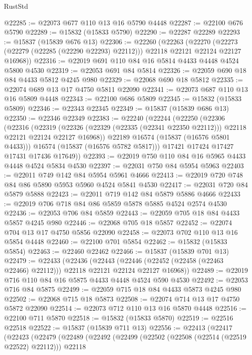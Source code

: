 \begin{lexlean}{RustStd}
\begin{coremodule}
@22285 := @22073 @677 @110 @13 @16 @5790 @4448
@22287 := @22100 @676 @5790
@22289 := @15832 (@15833 @5790)
@22290 := @22287 @22289
@22293 := @15837 (@15839 @676 @13)
@22306 := @22260
    (@22263
      (@22270 (@22273 (@22279 (@22285 (@22290 @22293) @22112))) @22118 @22121 @22124 @22127 @16968))
@22316 := @22019 @691 @110 @84 @16 @5814 @4433 @4448 @4524 @5800 @4530
@22319 := @22053 @691 @84 @5814
@22326 := @22059 @690 @18 @84 @4433 @5812 @4245 @980
@22329 := @22068 @690 @18 @5812
@22335 := @22074 @689 @13 @17 @4750 @5811 @22090
@22341 := @22073 @687 @110 @13 @16 @5809 @4448
@22343 := @22100 @686 @5809
@22345 := @15832 (@15833 @5809)
@22346 := @22343 @22345
@22349 := @15837 (@15839 @686 @13)
@22350 := @22346 @22349
@22383 := @22240
    (@22244
      (@22250
        (@22306
          (@22316
            (@22319
              (@22326 (@22329 (@22335 (@22341 @22350 @22112))) @22118 @22121 @22124 @22127 @16968))
            @22189
            @16574
            (@15837 (@16576 @5801 @4433)))
          @16574
          (@15837 (@16576 @5782 @5817)))
        @17421
        @17424
        @17427
        @17431
        @17436
        @17649))
@22393 := @22019 @750 @110 @84 @16 @5965 @4433 @4448 @4524 @5834 @4530
@22397 := @22031 @750 @84 @5954 @5963
@22403 := @22011 @749 @142 @84 @5954 @5961 @4666
@22413 := @22019 @720 @748 @84 @86 @5890 @5953 @5960 @4524 @5841 @4530
@22417 := @22031 @720 @84 @5879 @5888
@22423 := @22011 @719 @142 @84 @5879 @5886 @4666
@22433 := @22019 @706 @718 @84 @86 @5859 @5878 @5885 @4524 @2574 @4530
@22436 := @22053 @706 @84 @5859
@22443 := @22059 @705 @18 @84 @4433 @5857 @4245 @980
@22446 := @22068 @705 @18 @5857
@22452 := @22074 @704 @13 @17 @4750 @5856 @22090
@22458 := @22073 @702 @110 @13 @16 @5854 @4448
@22460 := @22100 @701 @5854
@22462 := @15832 (@15833 @5854)
@22463 := @22460 @22462
@22466 := @15837 (@15839 @701 @13)
@22479 := @22433
    (@22436
      (@22443 (@22446 (@22452 (@22458 (@22463 @22466) @22112))) @22118 @22121 @22124 @22127 @16968))
@22489 := @22019 @716 @110 @84 @16 @5875 @4433 @4448 @4524 @590 @4530
@22492 := @22053 @716 @84 @5875
@22499 := @22059 @715 @18 @84 @4433 @5873 @4245 @980
@22502 := @22068 @715 @18 @5873
@22508 := @22074 @714 @13 @17 @4750 @5872 @22090
@22514 := @22073 @712 @110 @13 @16 @5870 @4448
@22516 := @22100 @711 @5870
@22518 := @15832 (@15833 @5870)
@22519 := @22516 @22518
@22522 := @15837 (@15839 @711 @13)
@22556 := @22413
    (@22417
      (@22423
        (@22479
          (@22489
            (@22492
              (@22499
                (@22502 (@22508 (@22514 (@22519 @22522) @22112)))
                @22118

\end{coremodule}
\end{lexlean}
